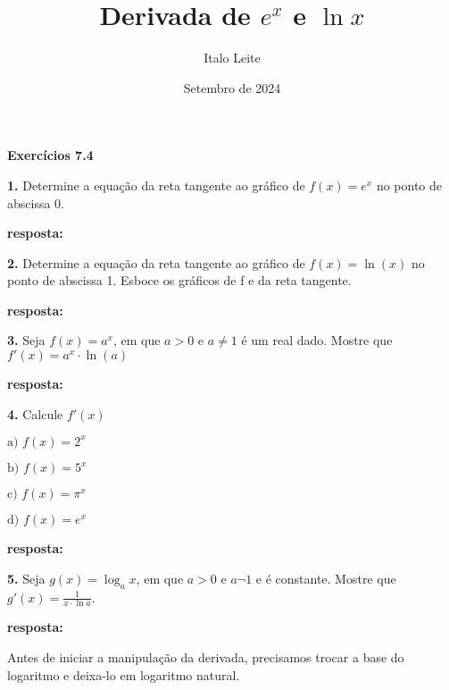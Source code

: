 \documentclass[article,12pt,oneside,a4paper,brazil]{abntex2}
\title{Derivada de $e^x$ e $\ln{x}$}
\author{Italo Leite}
\date{Setembro de 2024}
\begin{document}
	
	
	
	\begin{flushleft}
		\textbf{Exercícios 7.4}
		
		\textbf{1.} Determine a equação da reta tangente ao gráfico de $f(x) = e^x$ no ponto de abscissa 0.
		
		\textbf{resposta:}
		
		
		\vspace{1em}
		
		\textbf{2.} Determine a equação da reta tangente ao gráfico de $f(x) = \ln(x)$ no ponto de abscissa 1. Esboce os gráficos de f e da reta tangente.
		
		\textbf{resposta:}
		
		
		\vspace{1em}
		
		\textbf{3.} Seja $f(x) = a^x$, em que $a > 0$ e $a \neq 1$ é um real dado. Mostre que $f'(x)
		= a^x \cdot \ln(a)$	
		
		\textbf{resposta:}
		
		
		\vspace{1em}
		
		\textbf{4.} Calcule $f'(x)$	
			
		\begin{adjustwidth}{0.5cm}{0cm}
			$\text{a) } f(x) = 2^x$
			
			$\text{b) } f(x) = 5^x$
		
			$\text{c) } f(x) = \pi^x$
			
			$\text{d) } f(x) = e^x$
		\end{adjustwidth}	
			
		\textbf{resposta:}
		
		
		\vspace{1em}
		
		\textbf{5.} Seja $g(x)=\log_{a}{x}$, em que $a > 0$ e $a \neg 1$ e é constante. Mostre que $g'(x)=\frac{1}{x \cdot \ln{a}}$.
		
		\textbf{resposta:}
		
		Antes de iniciar a manipulação da derivada, precisamos trocar a base do logaritmo e deixa-lo em logaritmo natural.
		

\end{flushleft}
\end{document}
